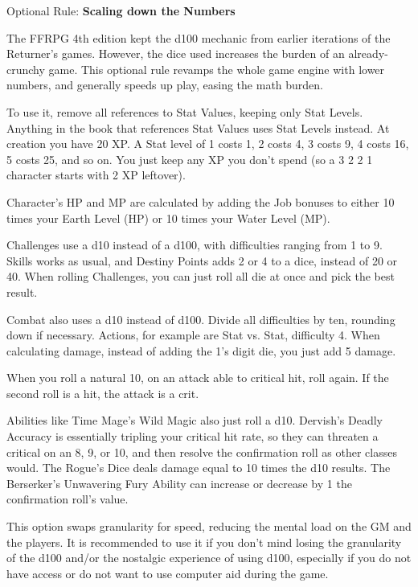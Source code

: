 \begin{multiboco}
Optional Rule: \textbf{Scaling down the Numbers}

The FFRPG 4th edition kept the d100 mechanic from earlier iterations of the Returner’s games. However, the dice used increases the burden of an already-crunchy game. This optional rule revamps the whole game engine with lower numbers, and generally speeds up play, easing the math burden.

To use it, remove all references to Stat Values, keeping only Stat Levels. Anything in the book that references Stat Values uses Stat Levels instead. At creation you have 20 XP. A Stat level of 1 costs 1, 2 costs 4, 3 costs 9, 4 costs 16, 5 costs 25, and so on. You just keep any XP you don't spend (so a 3 2 2 1 character starts with 2 XP leftover).

Character’s HP and MP are calculated by adding the Job bonuses to either 10 times your Earth Level (HP) or 10 times your Water Level (MP).

Challenges use a d10 instead of a d100, with difficulties ranging from 1 to 9. Skills works as usual, and Destiny Points adds 2 or 4 to a dice, instead of 20 or 40. When rolling Challenges, you can just roll all die at once and pick the best result.

Combat also uses a d10 instead of d100. Divide all difficulties by ten, rounding down if necessary.  Actions, for example are Stat vs. Stat, difficulty 4. When calculating damage, instead of adding the 1's digit die, you just add 5 damage.

When you roll a natural 10, on an attack able to critical hit, roll again. If the second roll is a hit, the attack is a crit.

Abilities like Time Mage’s Wild Magic also just roll a d10. Dervish's Deadly Accuracy is essentially tripling your critical hit rate, so they can threaten a critical on an 8, 9, or 10, and then resolve the confirmation roll as other classes would. The Rogue’s Dice deals damage equal to 10 times the d10 results. The Berserker’s Unwavering Fury Ability can increase or decrease by 1 the confirmation roll’s value.

This option swaps granularity for speed, reducing the mental load on the GM and the players. It is recommended to use it if you don’t mind losing the granularity of the d100 and/or the nostalgic experience of using d100, especially if you do not have access or do not want to use computer aid during the game.
\end{multiboco}

\begin{center}
\end{center}